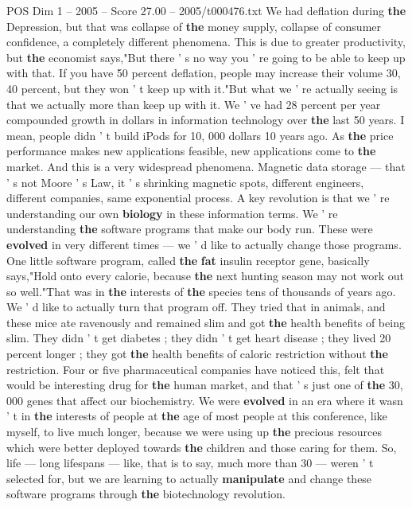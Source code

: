 \begin{textsample}{POS Dim 1 – 2005 – Score 27.00 – 2005/t000476.txt}
We had deflation during \textbf{the} Depression, but that was collapse of \textbf{the} money supply, collapse of consumer confidence, a completely different phenomena.
This is due to greater productivity, but \textbf{the} economist says,"But there ' s no way you ' re going to be able to keep up with that.
If you have 50 percent deflation, people may increase their volume 30, 40 percent, but they won ' t keep up with it."But what we ' re actually seeing is that we actually more than keep up with it.
We ' ve had 28 percent per year compounded growth in dollars in information technology over \textbf{the} last 50 years.
I mean, people didn ' t build iPods for 10, 000 dollars 10 years ago.
As \textbf{the} price performance makes new applications feasible, new applications come to \textbf{the} market.
And this is a very widespread phenomena.
Magnetic data storage — that ' s not Moore ' s Law, it ' s shrinking magnetic spots, different engineers, different companies, same exponential process.
A key revolution is that we ' re understanding our own \textbf{biology} in these information terms.
We ' re understanding \textbf{the} software programs that make our body run.
These were \textbf{evolved} in very different times — we ' d like to actually change those programs.
One little software program, called \textbf{the} \textbf{fat} insulin receptor gene, basically says,"Hold onto every calorie, because \textbf{the} next hunting season may not work out so well."That was in \textbf{the} interests of \textbf{the} species tens of thousands of years ago.
We ' d like to actually turn that program off.
They tried that in animals, and these mice ate ravenously and remained slim and got \textbf{the} health benefits of being slim.
They didn ' t get diabetes ; they didn ' t get heart disease ; they lived 20 percent longer ; they got \textbf{the} health benefits of caloric restriction without \textbf{the} restriction.
Four or five pharmaceutical companies have noticed this, felt that would be interesting drug for \textbf{the} human market, and that ' s just one of \textbf{the} 30, 000 genes that affect our biochemistry.
We were \textbf{evolved} in an era where it wasn ' t in \textbf{the} interests of people at \textbf{the} age of most people at this conference, like myself, to live much longer, because we were using up \textbf{the} precious resources which were better deployed towards \textbf{the} children and those caring for them.
So, life — long lifespans — like, that is to say, much more than 30 — weren ' t selected for, but we are learning to actually \textbf{manipulate} and change these software programs through \textbf{the} biotechnology revolution.

\end{textsample}
